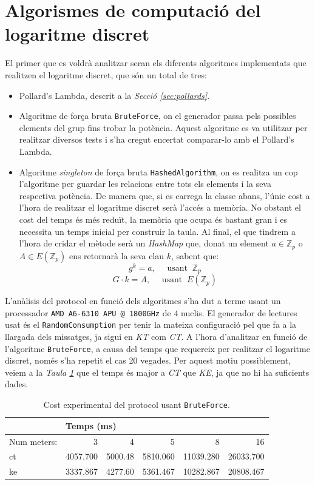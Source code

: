 \section{Algorismes de computació del logaritme discret}
El primer que es voldrà analitzar seran els diferents algoritmes implementats que realitzen el logaritme discret, que són un total de tres:
\begin{itemize}
	\item Pollard's Lambda, descrit a la \textit{Secció \ref{sec:pollards}}.
	\item Algoritme de força bruta \texttt{BruteForce}, on el generador passa pels possibles elements del grup fins trobar la potència. Aquest algoritme es va utilitzar per realitzar diversos tests i s'ha cregut encertat comparar-lo amb el Pollard's Lambda.
	\item Algoritme \textit{singleton} de força bruta \texttt{HashedAlgorithm}, on es realitza un cop l'algoritme per guardar les relacions entre tots els elements i la seva respectiva potència. De manera que, si es carrega la classe abans, l'únic cost a l'hora de realitzar el logaritme discret serà l'accés a memòria. No obstant el cost del temps és més reduït, la memòria que ocupa és bastant gran i es necessita un temps inicial per construir la taula. Al final, el que tindrem a l'hora de cridar el mètode serà un \textit{HashMap} que, donat un element $a \in \mathbb{Z}_p$ o  $A \in E(\mathbb{Z}_p)$ ens retornarà la seva clau $k$, sabent que:
	\[g^k = a ,\quad \textrm{ usant  }\ \mathbb{Z}_p\]
	\[G \cdot k = A,\quad \textrm{ usant  }\ E(\mathbb{Z}_p)\]
\end{itemize}
L'anàlisis del protocol en funció dels algoritmes s'ha dut a terme usant un processador \texttt{AMD A6-6310 APU @ 1800GHz} de $4$ nuclis. El generador de lectures usat és el \texttt{RandomConsumption} per tenir la mateixa configuració pel que fa a la llargada dels missatges, ja sigui en \textit{KT} com \textit{CT}. A l'hora d'analitzar en funció de l'algoritme \texttt{BruteForce}, a causa del temps que requereix per realitzar el logaritme discret, només s'ha repetit el cas 20 vegades. Per aquest motiu possiblement, veiem a la \textit{Taula \ref{tab:brute}} que el temps és major a \textit{CT }que \textit{KE}, ja que no hi ha suficients dades.
	\begin{table}[H]
		\centering
		\begin{tabular}{lrrrrr}
			\centering
			&\multicolumn{5}{l}{\centering Temps (ms)}\\
			\toprule
			Num meters: &           3  &       4  &           5  &            8  &            16 \\
			\midrule
			ct &  4057.700 &  5000.48 &  5810.060 &  11039.280 &  26033.700 \\
			ke &  3337.867 &  4277.60 &  5361.467 &  10282.867 &  20808.467 \\
			\bottomrule
		\end{tabular}
		\caption{Cost experimental del protocol usant \texttt{BruteForce}.}
		\label{tab:brute}
	\end{table}
